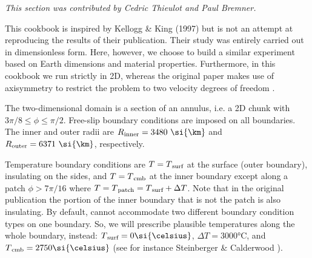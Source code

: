 
\textit{This section was contributed by Cedric Thieulot and Paul Bremner.}

This cookbook is inspired by Kellogg \& King (1997) \cite{keki97} but is not an attempt at reproducing the results of their publication. Their study was entirely carried out in dimensionless form. Here, however, we choose to build a similar experiment based on Earth dimensions and material properties.
Furthermore, in this cookbook we run strictly in 2D, whereas the original paper makes use of axisymmetry to restrict the problem to two velocity degrees of freedom \cite{kiha92}.

The two-dimensional domain is a section of an annulus, i.e. a 2D chunk with $ 3\pi/8 \leq \phi \leq \pi/2$. Free-slip boundary conditions are imposed on all boundaries. The inner and outer radii are $R\textsubscript{inner}=3480~\si{\km}$ and $R\textsubscript{outer}=6371~\si{\km}$, respectively.

Temperature boundary conditions are $T=T\textsubscript{surf}$ at the surface (outer boundary), insulating on the sides, and $T=T\textsubscript{cmb}$ at the inner boundary except along a patch $\phi > 7\pi/16$ where $T=T\textsubscript{patch}=T\textsubscript{surf}+\Delta T$.
Note that in the original publication the portion of the inner boundary that is not the patch is also insulating. By default, \aspect{} cannot accommodate two different boundary condition types on one boundary. So, we will prescribe plausible temperatures along the whole boundary, instead: $T\textsubscript{surf}=0\si{\celsius}$, $\Delta T=3000\si{\celsius}$, and $T\textsubscript{cmb}=2750\si{\celsius}$ (see for instance Steinberger \& Calderwood \cite{stca06}).

